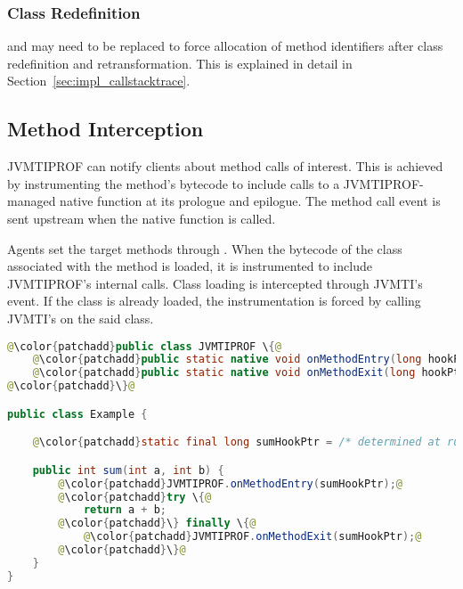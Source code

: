 \subsubsection*{Class Redefinition}

 and  may need to be replaced to force allocation of method identifiers after class redefinition and retransformation. This is explained in detail in Section~\ref{sec:impl_callstacktrace}.

\subsection{Method Interception}

JVMTIPROF can notify clients about method calls of interest. This is achieved by instrumenting the method's bytecode to include calls to a JVMTIPROF-managed native function at its prologue and epilogue. The method call event is sent upstream when the native function is called.

Agents set the target methods through . When the bytecode of the class associated with the method is loaded, it is instrumented to include JVMTIPROF's internal calls. Class loading is intercepted through JVMTI's   event. If the class is already loaded, the instrumentation is forced by calling JVMTI's  on the said class.

\medskip
\begin{lstlisting}[language=Java,frame=tb,escapechar=@,captionpos=b,caption=Example instrumentation applied by method interception. Instrumented code is in gray. The \code{sum} method is modified such that JVMTIPROF is notified about entries and exits on it.,label=lst:method_interception_instrumentation]
@\color{patchadd}public class JVMTIPROF \{@
    @\color{patchadd}public static native void onMethodEntry(long hookPtr);@
    @\color{patchadd}public static native void onMethodExit(long hookPtr);@
@\color{patchadd}\}@

public class Example {

    @\color{patchadd}static final long sumHookPtr = /* determined at runtime */;@

    public int sum(int a, int b) {
        @\color{patchadd}JVMTIPROF.onMethodEntry(sumHookPtr);@
        @\color{patchadd}try \{@
            return a + b;
        @\color{patchadd}\} finally \{@
            @\color{patchadd}JVMTIPROF.onMethodExit(sumHookPtr);@
        @\color{patchadd}\}@
    }
}
\end{lstlisting}

